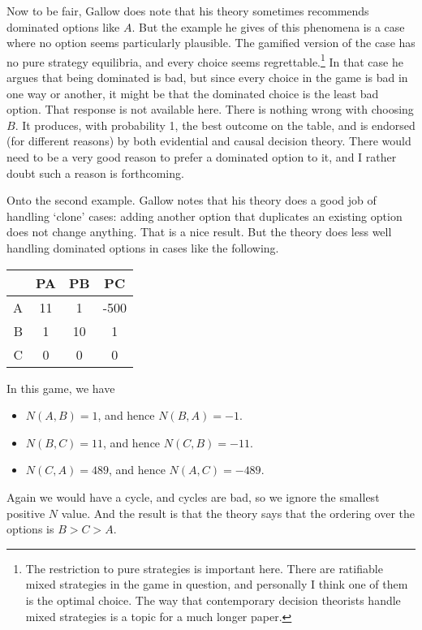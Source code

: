\documentclass[
  12pt,
]{article}
\providecommand{\tightlist}{%
  \setlength{\itemsep}{0pt}\setlength{\parskip}{0pt}}
\begin{document}
Now to be fair, Gallow does note that his theory sometimes recommends
dominated options like \(A\). But the example he gives of this phenomena
is a case where no option seems particularly plausible. The gamified
version of the case has no pure strategy equilibria, and every choice
seems regrettable.\footnote{The restriction to pure strategies is
  important here. There are ratifiable mixed strategies in the game in
  question, and personally I think one of them is the optimal choice.
  The way that contemporary decision theorists handle mixed strategies
  is a topic for a much longer paper.} In that case he argues that being
dominated is bad, but since every choice in the game is bad in one way
or another, it might be that the dominated choice is the least bad
option. That response is not available here. There is nothing wrong with
choosing \(B\). It produces, with probability 1, the best outcome on the
table, and is endorsed (for different reasons) by both evidential and
causal decision theory. There would need to be a very good reason to
prefer a dominated option to it, and I rather doubt such a reason is
forthcoming.

Onto the second example. Gallow notes that his theory does a good job of
handling `clone' cases: adding another option that duplicates an
existing option does not change anything. That is a nice result. But the
theory does less well handling dominated options in cases like the
following.

\begin{table}[!h]
\centering
\begin{tabular}[t]{>{}r|ccc}
\toprule
 & PA & PB & PC\\
\midrule
A & 11 & 1 & -500\\
B & 1 & 10 & 1\\
C & 0 & 0 & 0\\
\bottomrule
\end{tabular}
\end{table}

In this game, we have

\begin{itemize}
\tightlist
\item
  \(N(A, B) = 1\), and hence \(N(B, A) = -1\).
\item
  \(N(B, C) = 11\), and hence \(N(C, B) = -11\).
\item
  \(N(C, A) = 489\), and hence \(N(A, C) = -489\).
\end{itemize}

Again we would have a cycle, and cycles are bad, so we ignore the
smallest positive \(N\) value. And the result is that the theory says
that the ordering over the options is \(B > C > A\).
\end{document}
